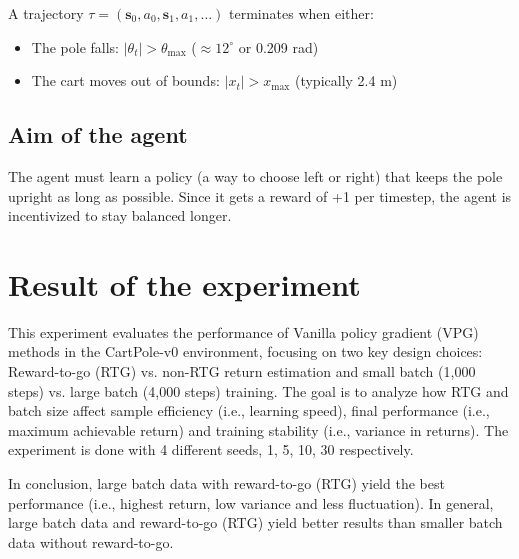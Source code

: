 \documentclass{article} %
\begin{document}
A trajectory $\tau = (\mathbf{s}_0, a_0, \mathbf{s}_1, a_1, \dots)$ terminates when either:
\begin{itemize}
    \item The pole falls: $|\theta_t| > \theta_\text{max}$ ($\approx 12^\circ$ or 0.209 rad)
    \item The cart moves out of bounds: $|x_t| > x_\text{max}$ (typically 2.4 m)
\end{itemize}

\subsection{Aim of the agent}
The agent must learn a policy (a way to choose left or right) that keeps the pole upright as long as possible. Since it gets a reward of +1 per timestep, the agent is incentivized to stay balanced longer.

\section{Result of the experiment}
This experiment evaluates the performance of Vanilla policy gradient (VPG) methods in the CartPole-v0 environment, focusing on two key design choices: Reward-to-go (RTG) vs. non-RTG return estimation and small batch (1,000 steps) vs. large batch (4,000 steps) training. The goal is to analyze how RTG and batch size affect sample efficiency (i.e., learning speed), final performance (i.e., maximum achievable return) and training stability (i.e., variance in returns). The experiment is done with 4 different seeds, 1, 5, 10, 30 respectively.

In conclusion, large batch data with reward-to-go (RTG) yield the best performance (i.e., highest return, low variance and less fluctuation). In general, large batch data and reward-to-go (RTG) yield better results than smaller batch data without reward-to-go.
\end{document}
